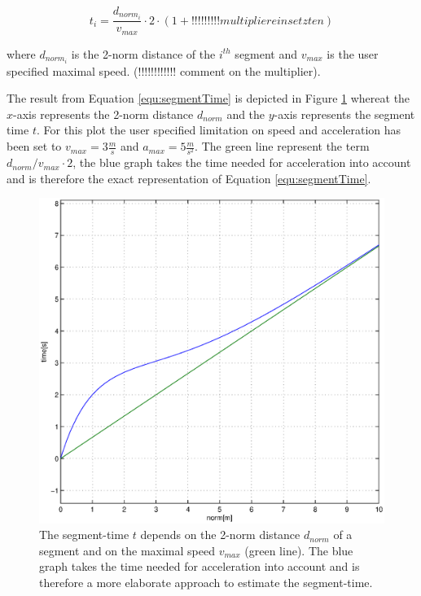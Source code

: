 \begin{equation}
t_i = \frac{d_{norm_i}}{v_{max}} \cdot 2 \cdot (1 + !!!!!!!!!multiplier einsetzten)
\label{equ:segmentTime}
\end{equation}

where $d_{norm_i}$ is the 2-norm distance of the $i^{th}$ segment and $v_{max}$ is the user specified maximal speed. (!!!!!!!!!!!! comment on the multiplier). \newline

The result from Equation \ref{equ:segmentTime} is depicted in Figure \ref{pic:timeEstimation} whereat the $x$-axis represents the 2-norm distance $d_{norm}$ and the $y$-axis represents the segment time $t$. For this plot the user specified limitation on speed and acceleration has been set to $v_{max} = 3 \frac{m}{s}$ and $a_{max} = 5 \frac{m}{s^2}$. The green line represent the term $d_{norm}/v_{max} \cdot 2$, the blue graph takes the time needed for acceleration into account and is therefore the exact representation of Equation \ref{equ:segmentTime}. \newpage


\begin{figure}[h]
   \centering
   \includegraphics[width=1\textwidth]{pics/time_estimation.eps}
   \caption{The segment-time $t$ depends on the 2-norm distance $d_{norm}$ of a segment and on the maximal speed $v_{max}$ (green line). The blue graph takes  the time needed for acceleration into account and is therefore a more elaborate approach to estimate the segment-time.}
   \label{pic:timeEstimation}
\end{figure}

